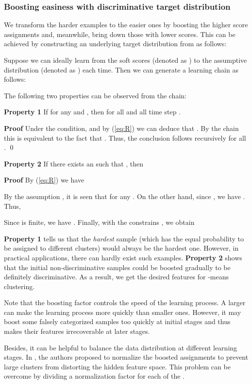 \documentclass[preprint,12pt]{elsarticle}
\begin{document}
\subsubsection{Boosting easiness with discriminative target distribution}

We transform the harder examples to the easier ones by boosting the higher score assignments
and, meanwhile, bring down those with lower scores. This can be achieved by constructing an underlying
target distribution  from  as follows:


Suppose we can ideally learn from the soft scores (denoted as ) to the assumptive distribution
(denoted as ) each time. Then we can generate a learning chain as follows:

The following two properties can be observed from the chain:

\textbf{Property 1} If  for any  and , then 
for all  and all time step .

\textbf{Proof} Under the condition, and by (\ref{eq:R}) we can deduce that .
By the chain this is equivalent to the fact that .
Thus, the conclusion  follows recursively for all . \qed

\textbf{Property 2} If there exists an  such that , then


\textbf{Proof} By (\ref{eq:R}) we have

By the assumption , it is seen that
 for any . On the other hand, since , we have . Thus,

Since  is finite, we have 
. Finally, with the constrains , we obtain


\textbf{Property 1} tells us that the \textit{hardest} sample (which has the equal probability to be assigned
to different clusters) would always be the hardest one. However, in practical applications, there can hardly
exist such examples. \textbf{Property 2} shows that the initial non-discriminative samples could be boosted
gradually to be definitely discriminative. As a result, we get the desired features for -means clustering.

Note that the boosting factor  controls the speed of the learning process. A larger  can make
the learning process more quickly than smaller ones. However, it may boost some falsely categorized samples
too quickly at initial stages and thus makes their features irrecoverable at later stages.

Besides, it can be helpful to balance the data distribution at different learning stages. In \cite{Xie2015DEC},
the authors proposed to normalize the boosted assignments to prevent large clusters from distorting the hidden
feature space. This problem can be overcome by dividing a normalization factor  for
each of the .
\end{document}
